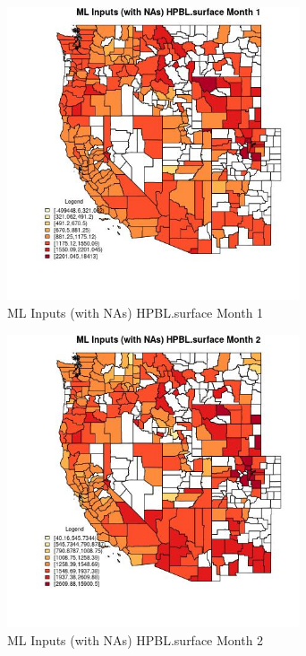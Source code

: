 \begin{figure} 
\centering  
\includegraphics[width=0.77\textwidth]{Code_Outputs/Report_ML_input_PM25_Step4_part_e_de_duplicated_aves_compiled_2019-05-21wNAs_CountyHPBLsurfacemedianMonth1.jpg} 
\caption{\label{fig:Report_ML_input_PM25_Step4_part_e_de_duplicated_aves_compiled_2019-05-21wNAsCountyHPBLsurfacemedianMonth1}ML Inputs (with NAs) HPBL.surface Month 1} 
\end{figure} 
 

\begin{figure} 
\centering  
\includegraphics[width=0.77\textwidth]{Code_Outputs/Report_ML_input_PM25_Step4_part_e_de_duplicated_aves_compiled_2019-05-21wNAs_CountyHPBLsurfacemedianMonth2.jpg} 
\caption{\label{fig:Report_ML_input_PM25_Step4_part_e_de_duplicated_aves_compiled_2019-05-21wNAsCountyHPBLsurfacemedianMonth2}ML Inputs (with NAs) HPBL.surface Month 2} 
\end{figure} 
 

